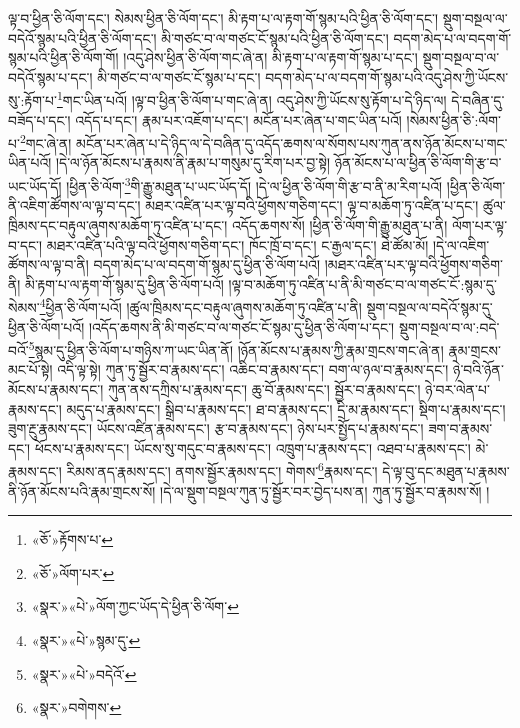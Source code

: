 ལྟ་བ་ཕྱིན་ཅི་ལོག་དང་། སེམས་ཕྱིན་ཅི་ལོག་དང་། མི་རྟག་པ་ལ་རྟག་གོ་སྙམ་པའི་ཕྱིན་ཅི་ལོག་དང་། སྡུག་བསྔལ་ལ་བདེའོ་སྙམ་པའི་ཕྱིན་ཅི་ལོག་དང་། མི་གཙང་བ་ལ་གཙང་ངོ་སྙམ་པའི་ཕྱིན་ཅི་ལོག་དང་། བདག་མེད་པ་ལ་བདག་གོ་སྙམ་པའི་ཕྱིན་ཅི་ལོག་གོ། །འདུ་ཤེས་ཕྱིན་ཅི་ལོག་གང་ཞེ་ན། མི་རྟག་པ་ལ་རྟག་གོ་སྙམ་པ་དང་། སྡུག་བསྔལ་བ་ལ་བདེའོ་སྙམ་པ་དང་། མི་གཙང་བ་ལ་གཙང་ངོ་སྙམ་པ་དང་། བདག་མེད་པ་ལ་བདག་གོ་སྙམ་པའི་འདུ་ཤེས་ཀྱི་ཡོངས་སུ་:རྟོག་པ་\footnote{«ཅོ་»རྟོགས་པ་}གང་ཡིན་པའོ། །ལྟ་བ་ཕྱིན་ཅི་ལོག་པ་གང་ཞེ་ན། འདུ་ཤེས་ཀྱི་ཡོངས་སུ་རྟོག་པ་དེ་ཉིད་ལ། དེ་བཞིན་དུ་བཟོད་པ་དང་། འདོད་པ་དང་། རྣམ་པར་འཇོག་པ་དང་། མངོན་པར་ཞེན་པ་གང་ཡིན་པའོ། །སེམས་ཕྱིན་ཅི་:ལོག་པ་\footnote{«ཅོ་»ལོག་པར་}གང་ཞེ་ན། མངོན་པར་ཞེན་པ་དེ་ཉིད་ལ་དེ་བཞིན་དུ་འདོད་ཆགས་ལ་སོགས་པས་ཀུན་ནས་ཉོན་མོངས་པ་གང་ཡིན་པའོ། །དེ་ལ་ཉོན་མོངས་པ་རྣམས་ནི་རྣམ་པ་གསུམ་དུ་རིག་པར་བྱ་སྟེ། ཉོན་མོངས་པ་ལ་ཕྱིན་ཅི་ལོག་གི་རྩ་བ་ཡང་ཡོད་དོ། །ཕྱིན་ཅི་ལོག་\footnote{«སྣར་»«པེ་»ལོག་ཀྱང་ཡོད་དེ་ཕྱིན་ཅི་ལོག་}གི་རྒྱུ་མཐུན་པ་ཡང་ཡོད་དོ། །དེ་ལ་ཕྱིན་ཅི་ལོག་གི་རྩ་བ་ནི་མ་རིག་པའོ། །ཕྱིན་ཅི་ལོག་ནི་འཇིག་ཚོགས་ལ་ལྟ་བ་དང་། མཐར་འཛིན་པར་ལྟ་བའི་ཕྱོགས་གཅིག་དང་། ལྟ་བ་མཆོག་ཏུ་འཛིན་པ་དང་། ཚུལ་ཁྲིམས་དང་བརྟུལ་ཞུགས་མཆོག་ཏུ་འཛིན་པ་དང་། འདོད་ཆགས་སོ། །ཕྱིན་ཅི་ལོག་གི་རྒྱུ་མཐུན་པ་ནི། ལོག་པར་ལྟ་བ་དང་། མཐར་འཛིན་པའི་ལྟ་བའི་ཕྱོགས་གཅིག་དང་། ཁོང་ཁྲོ་བ་དང་། ང་རྒྱལ་དང་། ཐེ་ཚོམ་མོ། །དེ་ལ་འཇིག་ཚོགས་ལ་ལྟ་བ་ནི། བདག་མེད་པ་ལ་བདག་གོ་སྙམ་དུ་ཕྱིན་ཅི་ལོག་པའོ། །མཐར་འཛིན་པར་ལྟ་བའི་ཕྱོགས་གཅིག་ནི། མི་རྟག་པ་ལ་རྟག་གོ་སྙམ་དུ་ཕྱིན་ཅི་ལོག་པའོ། །ལྟ་བ་མཆོག་ཏུ་འཛིན་པ་ནི་མི་གཙང་བ་ལ་གཙང་ངོ་:སྙམ་དུ་སེམས་\footnote{«སྣར་»«པེ་»སྙམ་དུ་}ཕྱིན་ཅི་ལོག་པའོ། །ཚུལ་ཁྲིམས་དང་བརྟུལ་ཞུགས་མཆོག་ཏུ་འཛིན་པ་ནི། སྡུག་བསྔལ་ལ་བདེའོ་སྙམ་དུ་ཕྱིན་ཅི་ལོག་པའོ། །འདོད་ཆགས་ནི་མི་གཙང་བ་ལ་གཙང་ངོ་སྙམ་དུ་ཕྱིན་ཅི་ལོག་པ་དང་། སྡུག་བསྔལ་བ་ལ་:བདེ་བའོ་\footnote{«སྣར་»«པེ་»བདེའོ་}སྙམ་དུ་ཕྱིན་ཅི་ལོག་པ་གཉིས་ཀ་ཡང་ཡིན་ནོ། །ཉོན་མོངས་པ་རྣམས་ཀྱི་རྣམ་གྲངས་གང་ཞེ་ན། རྣམ་གྲངས་མང་པོ་སྟེ། འདི་ལྟ་སྟེ། ཀུན་ཏུ་སྦྱོར་བ་རྣམས་དང་། འཆིང་བ་རྣམས་དང་། བག་ལ་ཉལ་བ་རྣམས་དང་། ཉེ་བའི་ཉོན་མོངས་པ་རྣམས་དང་། ཀུན་ནས་དཀྲིས་པ་རྣམས་དང་། ཆུ་བོ་རྣམས་དང་། སྦྱོར་བ་རྣམས་དང་། ཉེ་བར་ལེན་པ་རྣམས་དང་། མདུད་པ་རྣམས་དང་། སྒྲིབ་པ་རྣམས་དང་། ཐ་བ་རྣམས་དང་། དྲི་མ་རྣམས་དང་། སྡིག་པ་རྣམས་དང་། ཟུག་རྔུ་རྣམས་དང་། ཡོངས་འཛིན་རྣམས་དང་། རྩ་བ་རྣམས་དང་། ཉེས་པར་སྤྱོད་པ་རྣམས་དང་། ཟག་བ་རྣམས་དང་། ཕོངས་པ་རྣམས་དང་། ཡོངས་སུ་གདུང་བ་རྣམས་དང་། འཁྲུག་པ་རྣམས་དང་། འཐབ་པ་རྣམས་དང་། མེ་རྣམས་དང་། རིམས་ནད་རྣམས་དང་། ནགས་སྦྱོར་རྣམས་དང་། གེགས་\footnote{«སྣར་»བགེགས་}རྣམས་དང་། དེ་ལྟ་བུ་དང་མཐུན་པ་རྣམས་ནི་ཉོན་མོངས་པའི་རྣམ་གྲངས་སོ། །དེ་ལ་སྡུག་བསྔལ་ཀུན་ཏུ་སྦྱོར་བར་བྱེད་པས་ན། ཀུན་ཏུ་སྦྱོར་བ་རྣམས་སོ། །
